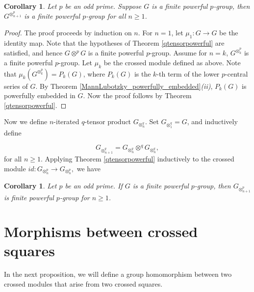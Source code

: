 \documentclass[12pt]{elsarticle}
\newtheorem{corollary}[theorem]{Corollary}
\newtheorem*{main corollary*}{Main Corollary}
\theoremstyle{definition}
\newcommand{\ptens}{
	\otimes^p}
\begin{document}
\begin{corollary} \label{Gqtensorpowerful}
	Let $p$ be an odd prime. Suppose $G$ is a finite powerful $p$-group, then $G^{\otimes^p_{n+1}}$ is a finite powerful $p$-group for all $n\geq 1$.
\end{corollary}

\begin{proof}
    The proof proceeds by induction on $n$. For $n=1$, let $\mu_1: G \to G$ be the identity map. Note that the hypotheses of Theorem \ref{qtensorpowerful} are satisfied, and hence $G \ptens G$ is a finite powerful $p$-group. Assume for $n=k$, $G^{\ptens_k}$ is a finite powerful $p$-group. Let $\mu_k$ be the crossed module defined as above. Note that $\mu_k(G^{\ptens_k})=P_k(G)$, where $P_k(G)$ is the $k$-th term of the lower $p$-central series of $G$. By Theorem \ref{MannLubotzky_powerfully_embedded}\textit{(ii)}, $P_k(G)$ is powerfully embedded in $G$. Now the proof follows by Theorem \ref{qtensorpowerful}.    
\end{proof}



Now we define $n$-iterated $q$-tensor product $G_{\otimes^q_{n}}$. Set $G_{\otimes^q _{1}}=G$, and inductively define 

\begin{equation}\label{iteratedqtensordefn}
    G_{\otimes^q_{n+1}}=G_{\otimes^q_{n}}\otimes^q G_{\otimes^q_{n}},
\end{equation} for all $n\geq 1.$ Applying Theorem \ref{qtensorpowerful} inductively to the crossed module $id:G_{\otimes^p_{n}}\to G_{\otimes^p_{n}},$ we have
\begin{corollary}\label{n-iterated qtensor product is powerful}
    Let $p$ be an odd prime. If $G$ is a finite powerful $p$-group, then $G_{\otimes^p_{n+1}}$ is finite powerful $p$-group for $n\geq 1$. 
\end{corollary}

\section{Morphisms between crossed squares} \label{section: crossed square morphisms}
In the next proposition, we will define a group homomorphism between two crossed modules that arise from two crossed squares.
\end{document}
